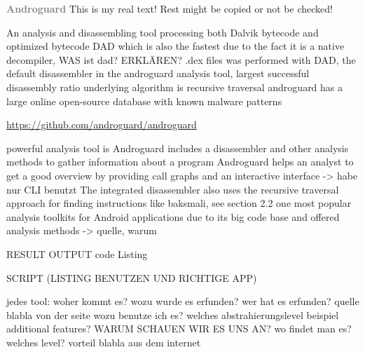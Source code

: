 \newline\newline\textbf{\textcolor{gray}{Androguard}}\newline
This is my real text! Rest might be copied or not be checked!

%
An analysis and disassembling tool processing both Dalvik bytecode and optimized bytecode\newline
DAD which is also the fastest due to the fact it is a native decompiler, WAS ist dad? ERKLÄREN? .dex files was performed with DAD, the default disassembler
in the androguard analysis tool, largest successful disassembly
ratio\newline
underlying algorithm is recursive traversal\newline
androguard has a large online open-source database with known malware patterns\newline
\cite{kovachevaMaster}
%




\url{https://github.com/androguard/androguard}

powerful analysis tool is Androguard\newline
includes a disassembler and other analysis methods to gather information about a program\newline
Androguard helps an analyst to get a good overview by providing call graphs and an interactive interface -> habe nur CLI benutzt\newline
The integrated disassembler also uses the recursive traversal approach for finding instructions like baksmali, see section 2.2\newline
one most popular analysis toolkits for Android applications due to its big code base and offered analysis methods -> quelle, warum\newline


RESULT OUTPUT
code Listing

SCRIPT (LISTING BENUTZEN UND RICHTIGE APP)


jedes tool:\newline
woher kommt es?\newline
wozu wurde es erfunden?\newline
wer hat es erfunden? quelle\newline
blabla von der seite\newline
wozu benutze ich es?\newline
welches abstrahierungslevel\newline
beispiel\newline
additional features?\newline
WARUM SCHAUEN WIR ES UNS AN?\newline
wo findet man es?\newline
welches level?\newline
vorteil\newline
blabla aus dem internet\newline
